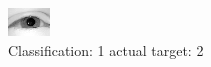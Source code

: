 \begin{figure}[h!]
\begin{center}
\includegraphics[width=0.60\columnwidth]{figures/ID2327_class_1_target_2.png}
\end{center}
\caption{ Classification: 1 actual target: 2}
\label{fig:ID2327_class_1_target_2}
\end{figure}

